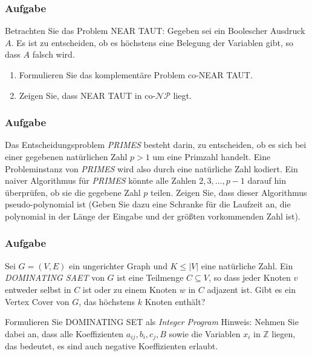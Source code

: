 \documentclass{beamer}
\begin{document}
\begin{frame}
\frametitle{Aufgabe}
Betrachten Sie das Problem NEAR TAUT: Gegeben sei ein Boolescher Ausdruck $A$. Es ist zu entscheiden, ob es höchstens eine Belegung der Variablen gibt, so dass $A$ falsch wird.
\begin{enumerate}
 \item Formulieren Sie das komplementäre Problem co-NEAR TAUT.
 \item Zeigen Sie, dass NEAR TAUT in co-$\mathcal{NP}$ liegt.
\end{enumerate}
\end{frame}
\begin{frame}
\frametitle{Aufgabe}
Das Entscheidungsproblem \textit{PRIMES} besteht darin, zu entscheiden, ob es sich bei einer gegebenen natürlichen Zahl $p>1$ um eine Primzahl handelt. 
Eine Probleminstanz von \textit{PRIMES} wird also durch eine natürliche Zahl kodiert. 
Ein naiver Algorithmus für \textit{PRIMES} könnte alle Zahlen $2,3,\ldots,p-1$ darauf hin überprüfen, ob sie die gegebene Zahl $p$ teilen. 
Zeigen Sie, dass dieser Algorithmus pseudo-polynomial ist 
(Geben Sie dazu eine Schranke für die Laufzeit an, die polynomial in der Länge der Eingabe und der größten vorkommenden Zahl ist).
\end{frame}
\begin{frame}
\frametitle{Aufgabe}
Sei $G=(V, E)$ ein ungerichter Graph und $K \leq |V|$ eine natürliche Zahl. 
Ein \emph{DOMINATING SAET} von $G$ ist eine Teilmenge $C \subseteq V$, so dass jeder Knoten $v$ entweder selbst in $C$ ist oder zu einem Knoten $w$ in $C$ adjazent ist. 
Gibt es ein Vertex Cover von $G$, das höchstens $k$ Knoten enthält?

Formulieren Sie DOMINATING SET als \emph{Integer Program} 
Hinweis: Nehmen Sie dabei an, dass alle Koeffizienten $a_{ij}, b_i, c_j, B$ sowie die Variablen $x_i$ in $\mathbb{Z}$ liegen, das bedeutet, es sind auch negative Koeffizienten erlaubt.  
\end{frame}


\end{document}
